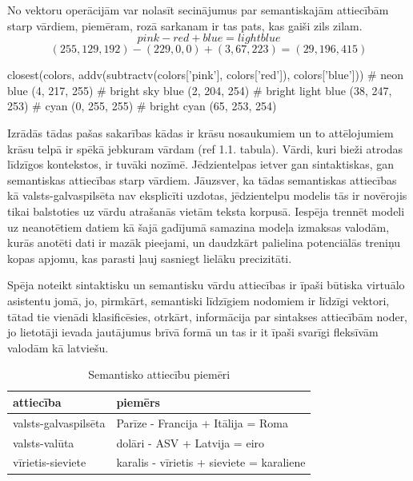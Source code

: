 No vektoru operācijām var nolasīt secinājumus par semantiskajām attiecībām starp vārdiem, piemēram, rozā sarkanam ir tas pats, kas gaiši zils zilam.
$$pink - red + blue = light blue$$
$$(255, 129, 192) - (229, 0, 0) + (3, 67, 223) = (29, 196, 415)$$
\begin{python}
closest(colors, addv(subtractv(colors['pink'], colors['red']), colors['blue']))
# neon blue (4, 217, 255)
# bright sky blue (2, 204, 254)
# bright light blue (38, 247, 253)
# cyan (0, 255, 255)
# bright cyan (65, 253, 254)
\end{python}



Izrādās tādas pašas sakarības kādas ir krāsu nosaukumiem un to attēlojumiem krāsu telpā ir spēkā jebkuram vārdam (ref 1.1. tabula). Vārdi, kuri bieži atrodas līdzīgos kontekstos, ir tuvāki nozīmē. Jēdzientelpas ietver gan sintaktiskas, gan semantiskas attiecības starp vārdiem. Jāuzsver, ka tādas semantiskas attiecības kā valsts-galvaspilsēta nav eksplicīti uzdotas, jēdzientelpu modelis tās ir novērojis tikai balstoties uz vārdu atrašanās vietām teksta korpusā. Iespēja trennēt modeli uz neanotētiem datiem kā šajā gadījumā samazina modeļa izmaksas valodām, kurās anotēti dati ir mazāk pieejami, un daudzkārt palielina potenciālās treniņu kopas apjomu, kas parasti ļauj sasniegt lielāku precizitāti.


Spēja noteikt sintaktisku un semantisku vārdu attiecības ir īpaši būtiska virtuālo asistentu jomā, jo, pirmkārt, semantiski līdzīgiem nodomiem ir līdzīgi vektori, tātad tie vienādi klasificēsies, otrkārt, informācija par sintakses attiecībām noder, jo lietotāji ievada jautājumus brīvā formā un tas ir it īpaši svarīgi fleksīvām valodām kā latviešu.



\begin{table}[htbp]
	\centering
	\caption{Semantisko attiecību piemēri}
	\begin{tabular}{ll}\toprule
		attiecība & piemērs  \\\midrule
		valsts-galvaspilsēta   & Parīze - Francija + Itālija = Roma \\
		valsts-valūta   & dolāri - ASV + Latvija = eiro \\
		vīrietis-sieviete   & karalis - vīrietis + sieviete = karaliene \\\bottomrule
	\end{tabular}%
	\label{tab:semantic-relationship-examples}%
\end{table}

